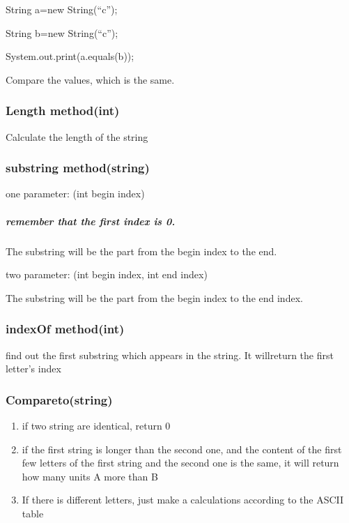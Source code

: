 \documentclass[
  paper=a4,
  ,captions=tableheading
]{scrartcl}
\begin{document}
String a=new String(\enquote{c});

String b=new String(\enquote{c});

System.out.print(a.equals(b));

Compare the values, which is the same.

\hypertarget{length-methodint}{%
\subsubsection{Length method(int)}\label{length-methodint}}

Calculate the length of the string

\hypertarget{substring-methodstring}{%
\subsubsection{substring method(string)}\label{substring-methodstring}}

one parameter: (int begin index)

\hypertarget{remember-that-the-first-index-is-0.}{%
\subparagraph{remember that the first index is
0.}\label{remember-that-the-first-index-is-0.}}

The substring will be the part from the begin index to the end.

two parameter: (int begin index, int end index)

The substring will be the part from the begin index to the end index.

\hypertarget{indexof-methodint}{%
\subsubsection{indexOf method(int)}\label{indexof-methodint}}

find out the first substring which appears in the string. It willreturn
the first letter's index

\hypertarget{comparetostring}{%
\subsubsection{Compareto(string)}\label{comparetostring}}

\begin{enumerate}
\def\labelenumi{\arabic{enumi}.}
\item
  if two string are identical, return 0
\item
  if the first string is longer than the second one, and the content of
  the first few letters of the first string and the second one is the
  same, it will return how many units A more than B
\item
  If there is different letters, just make a calculations according to
  the ASCII table
\end{enumerate}
\end{document}
